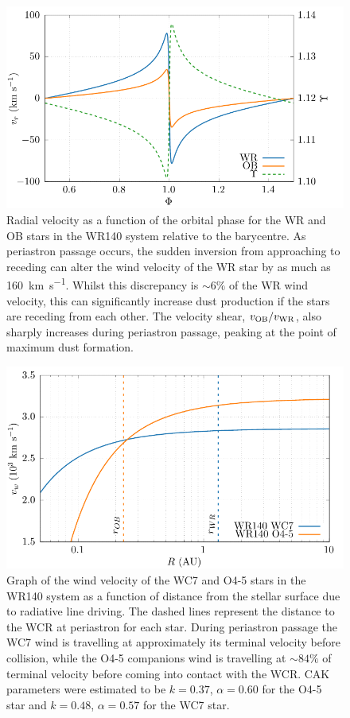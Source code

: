 \begin{figure}
  \centering
  \includegraphics{assets/radial-velocity/radial-shear.pdf}
  \caption[Radial velocity]{Radial velocity as a function of the orbital phase for the WR and OB stars in the WR140 system relative to the barycentre. As periastron passage occurs, the sudden inversion from approaching to receding can alter the wind velocity of the WR star by as much as \SI{160}{\kilo\metre\per\second}. Whilst this discrepancy is $\sim 6\%$ of the WR wind velocity, this can significantly increase dust production if the stars are receding from each other. The velocity shear, $v_\text{OB}/v_\text{WR}$, also sharply increases during periastron passage, peaking at the point of maximum dust formation.}
  \label{fig:p2-shear}
\end{figure}

\begin{figure}
  \centering
  \includegraphics{assets/stag.pdf}
  \caption{Graph of the wind velocity of the WC7 and O4-5 stars in the WR140 system as a function of distance from the stellar surface due to radiative line driving. The dashed lines represent the distance to the WCR at periastron for each star. During periastron passage the WC7 wind is travelling at approximately its terminal velocity before collision, while the O4-5 companions wind is travelling at $\sim 84\%$ of terminal velocity before coming into contact with the WCR. CAK parameters were estimated to be $k = 0.37$, $\alpha = 0.60$ for the O4-5 star and $k=0.48$, $\alpha = 0.57$ for the WC7 star.}
  \label{fig:p2-cak}
\end{figure}


